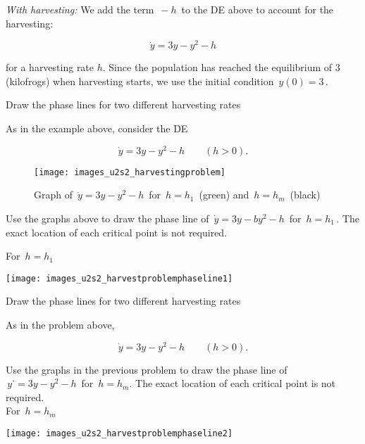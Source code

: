 \emph{With harvesting: } We add the term $\,−h\,$ to the DE above to account for the harvesting:

\begin{equation*}
  \dot y = 3y - y^2 -h
\end{equation*}

for a harvesting rate $h$.
Since the population has reached the equilibrium of $3$ (kilofrogs) when harvesting starts,
we use the initial condition $\, y(0)=3 \,$.

\clearpage

\begin{exercise}
  Draw the phase lines for two different harvesting rates
\end{exercise}

As in the example above, consider the DE

\begin{equation*}
  \dot y = 3y - y^2 - h \qquad (h > 0). 
\end{equation*}

\begin{figure}[ht!]
  \centering
  \texttt{[image: images\_u2s2\_harvestingproblem]}
  \caption{Graph of $\, \dot y=3y - y^2 - h\,$
    for $\, h = h_1\,$ (green) and $\,h = h_m\,$ (black)}
\end{figure}

Use the graphs above to draw the phase line of $\, \dot y=3y − by^2 −h \,$ for $\, h=h_1 \,$.
The exact location of each critical point is not required.

For $\, h = h_1 \,$

\texttt{[image: images\_u2s2\_harvestproblemphaseline1]}

\begin{exercise}
  Draw the phase lines for two different harvesting rates
\end{exercise}

As in the problem above,

\begin{equation*}
  \dot y = 3y - y^2 - h \qquad (h > 0). 
\end{equation*}

Use the graphs in the previous problem to draw
the phase line of $\, y˙= 3y − y^2 − h \,$ for $\, h = h_m$.
The exact location of each critical point is not required. \\

For $\, h = h_m \,$

\texttt{[image: images\_u2s2\_harvestproblemphaseline2]}

